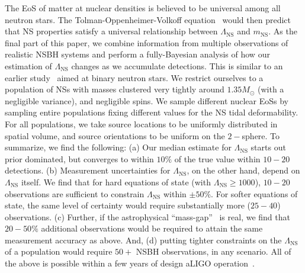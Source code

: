 \documentclass[aps,prd,amsmath,floats,floatfix, twocolumn,
superscriptaddress,nofootinbib,showpacs]{revtex4-1}
\newcommand{\red}{\textcolor{red}}
\newcommand{\prayush}{\textcolor{red!40!black}}
\newcommand{\lambdans}{\Lambda_\mathrm{NS}}
\newcommand{\mns}{m_\mathrm{NS}}
\begin{document}
The EoS of matter at nuclear densities is believed to be universal among all
neutron stars. The Tolman-Oppenheimer-Volkoff equation~\cite{Tolman:1939jz,
Oppenheimer:1939ne,1934PNAS...20..169T}
would then predict that NS properties satisfy a universal relationship
between $\lambdans$ and $\mns$. As the final part of
this paper, we combine information from multiple observations of realistic NSBH
systems and perform a fully-Bayesian analysis of how our estimation of
$\lambdans$ changes as we accumulate detections. This is similar to an earlier
study~\cite{DelPozzo:13} aimed at binary neutron stars.
We restrict ourselves to a population of NSs with masses clustered very tightly
around $1.35M_\odot$ (with a negligible variance), and negligible spins. We
sample different nuclear EoSs by sampling entire populations fixing different
values for the NS tidal deformability.
For all populations, we take source locations to be uniformly distributed in
spatial volume, and source orientations to be uniform on the $2-$sphere. To
summarize, we find the following:
% 
(a) Our median estimate for $\lambdans$ starts out prior dominated, but 
converges to within $10\%$ of the true value within $10-20$ detections.
(b) Measurement uncertainties for $\lambdans$, on the other hand, depend on
$\lambdans$ itself. We find that for hard equations of state (with 
$\lambdans\geq 1000$), $10-20$ observations are sufficient to constrain
$\lambdans$ within $\pm 50\%$. For softer equations of state, the same level
of certainty would require substantially more ($25-40$) observations.
% 
(c) Further, if the astrophysical ``mass-gap''~\cite{Bailyn:1997xt,
Kalogera:1996ci,Kreidberg:2012,Littenberg:2015tpa} is real, we find that $20-50\%$
additional observations would be required to attain the same measurement
accuracy as above. And, (d) putting tighter constraints on the $\lambdans$ of a
population would require $50+$ NSBH observations, in any scenario.
% 
All of the above is possible within a few years of design
aLIGO operation~\cite{Abadie:2010cfa}.
\end{document}
